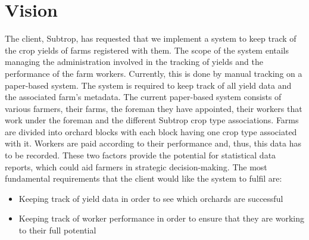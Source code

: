 \documentclass[11pt,fleqn]{book} %
\begin{document}
	
	\chapter{Vision}
		The client, Subtrop, has requested that we implement a system to keep track of the crop yields of farms registered with them. The scope of the system entails managing the administration involved in the tracking of yields and the performance of the farm workers. Currently, this is done by manual tracking on a paper-based system. The system is required to keep track of all yield data and the associated farm’s metadata.\newline\newline
		The current paper-based system consists of various farmers, their farms, the foreman they have appointed, their workers that work under the foreman and the different Subtrop crop type associations. Farms are divided into orchard blocks with each block having one crop type associated with it. Workers are paid according to their performance and, thus, this data has to be recorded. These two factors provide the potential for statistical data reports, which could aid farmers in strategic decision-making.\newline\newline
		The most fundamental requirements that the client would like the system to fulfil are:
	\begin{itemize}
		\item Keeping track of yield data in order to see which orchards are successful
		\item Keeping track of worker performance in order to ensure that they are working to their full potential
	\end{itemize}

	
	
	
\end{document}
